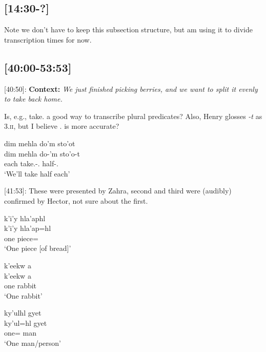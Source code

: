 \documentclass{article}
\newcommand{\tsb}{\textsubbar} %
\begin{document}
\subsection{[14:30-?]}
Note we don't have to keep this subsection structure, but am using it to divide transcription times for now.

\subsection{[40:00-53:53]}

[40:50]: \textbf{Context:} \textit{We just finished picking berries, and we want to split it evenly to take back home.} 

Is, e.g., take.\Pl{} a good way to transcribe plural predicates? Also, Henry glosses \textit{-t} as \textsc{3.ii}, but I believe \Tsg{}.\Ii{} is more accurate?

\begin{exe}
    \ex \glll dim mehla do\tsb{k}'m sto'ot \\
    dim mehla do\tsb{k}-'m sto'o-t \\
    \Prosp{} each take.\Pl{}-\Fpl{}.\Ii{} half-\Tsg{}.\Ii{}\\
    `We'll take half each'
\end{exe}

[41:53]: These were presented by Zahra, second and third were (audibly) confirmed by Hector, not sure about the first.

\begin{exe}
    \ex 
    \begin{xlist}
    \item \glll k'i'y hla\tsb{k}'aphl  \\
    k'i'y hla\tsb{k}'ap=hl \\
    one piece=\Cn{}\\
    `One piece [of bread]'
    
    \item \glll k'eekw \tsb{g}a\tsb{x}   \\
    k'eekw \tsb{g}a\tsb{x} \\
    one rabbit \\
    `One rabbit'

    \item \glll ky'ulhl gyet   \\
    ky'ul=hl gyet \\
    one=\Cn{} man \\
    `One man/person'
    \end{xlist}
\end{exe}
\end{document}
